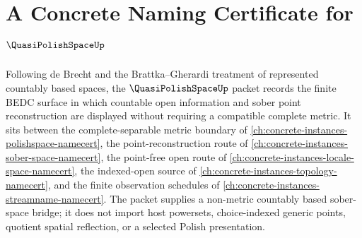 \chapter{A Concrete Naming Certificate for $\QuasiPolishSpaceUp$}
\label{ch:concrete-instances-quasi-polish-space-namecert}

Following de Brecht and the Brattka--Gherardi treatment of represented countably based spaces, the $\QuasiPolishSpaceUp$ packet records the finite BEDC surface in which countable open information and sober point reconstruction are displayed without requiring a compatible complete metric. It sits between the complete-separable metric boundary of \autoref{ch:concrete-instances-polishspace-namecert}, the point-reconstruction route of \autoref{ch:concrete-instances-sober-space-namecert}, the point-free open route of \autoref{ch:concrete-instances-locale-space-namecert}, the indexed-open source of \autoref{ch:concrete-instances-topology-namecert}, and the finite observation schedules of \autoref{ch:concrete-instances-streamname-namecert}. The packet supplies a non-metric countably based sober-space bridge; it does not import host powersets, choice-indexed generic points, quotient spatial reflection, or a selected Polish presentation.

